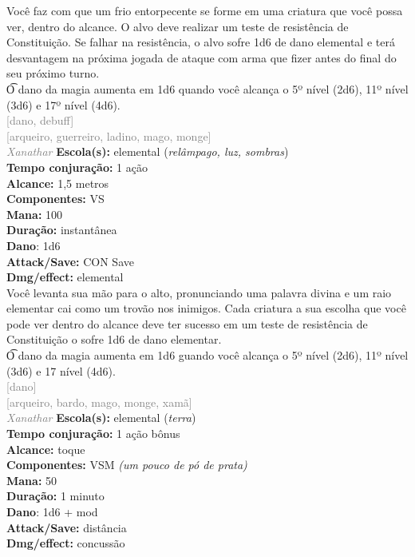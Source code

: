 \documentclass{RPG_Adventure}[2021/10/20]
\begin{document}
{\normalsize Você faz com que um frio entorpecente se forme em uma criatura que você possa ver, dentro do alcance. O alvo deve realizar um teste de resistência de Constituição. Se falhar na resistência, o alvo sofre 1d6 de dano elemental e terá desvantagem na próxima jogada de ataque com arma que fizer antes do final do seu próximo turno.\\\t O dano da magia aumenta em 1d6 quando você alcança o 5º nível (2d6), 11º nível (3d6) e 17º nível (4d6).\\}
{\scriptsize \textcolor{gray}{[dano, debuff]\\}}
{\scriptsize \textcolor{gray}{[arqueiro, guerreiro, ladino, mago, monge]\\}}
{\tiny \textcolor{gray}{\textit{Xanathar}}}\jump{}
{\small \t \textbf{Escola(s):} elemental (\textit{relâmpago, luz, sombras})\\\t \textbf{Tempo conjuração:} 1 ação\\\t \textbf{Alcance:} 1,5 metros\\\t \textbf{Componentes:} VS\\\t \textbf{Mana:} 100\\\t \textbf{Duração:} instantânea\\\t \textbf{Dano}: 1d6\\\t \textbf{Attack/Save:} CON Save\\\t \textbf{Dmg/effect:} elemental\\}
{\normalsize Você levanta sua mão para o alto, pronunciando uma palavra divina e um raio elementar cai como um trovão nos inimigos. Cada criatura a sua escolha que você pode ver dentro do alcance deve ter sucesso em um teste de resistência de Constituição o sofre 1d6 de dano elementar.\\\t O dano da magia aumenta em 1d6 guando você alcança o 5º nível (2d6), 11º nível (3d6) e 17 nível (4d6).\\}
{\scriptsize \textcolor{gray}{[dano]\\}}
{\scriptsize \textcolor{gray}{[arqueiro, bardo, mago, monge, xamã]\\}}
{\tiny \textcolor{gray}{\textit{Xanathar}}}\jump{}
{\small \t \textbf{Escola(s):} elemental (\textit{terra})\\\t \textbf{Tempo conjuração:} 1 ação bônus\\\t \textbf{Alcance:} toque\\\t \textbf{Componentes:} VSM \textit{(um pouco de pó de prata)}\\\t \textbf{Mana:} 50\\\t \textbf{Duração:} 1 minuto\\\t \textbf{Dano}: 1d6 + mod\\\t \textbf{Attack/Save:} distância\\\t \textbf{Dmg/effect:} concussão\\}
\end{document}

